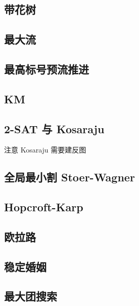 \documentclass[landscape, twocolumn, 8pt, a4paper, twoside]{extarticle}
\begin{document}
  \subsection{带花树}
    

  \subsection{最大流}
    
  
  \subsection{最高标号预流推进}
    
  
  \subsection{KM}
    

  \subsection{2-SAT 与 Kosaraju}
    注意 Kosaraju 需要建反图
    

  \subsection{全局最小割 Stoer-Wagner}
    

  \subsection{Hopcroft-Karp}
    

  \subsection{欧拉路}
    

  \subsection{稳定婚姻}
    

  \subsection{最大团搜索}
    
  
\end{document}
